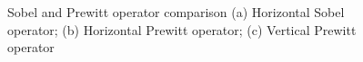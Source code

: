 \documentclass[twoside,a4paper,article]{combine}
\begin{document}
\begin{minipage}{\textwidth}\begin{figure}[H]
    \captionsetup{justification=centering}
    \centering
    \caption{Sobel and Prewitt operator comparison (a) Horizontal Sobel operator; 
    (b) Horizontal Prewitt operator; (c) Vertical Prewitt operator}\label{fig:prewittSobel}
\end{figure}\end{minipage}
\end{document}
